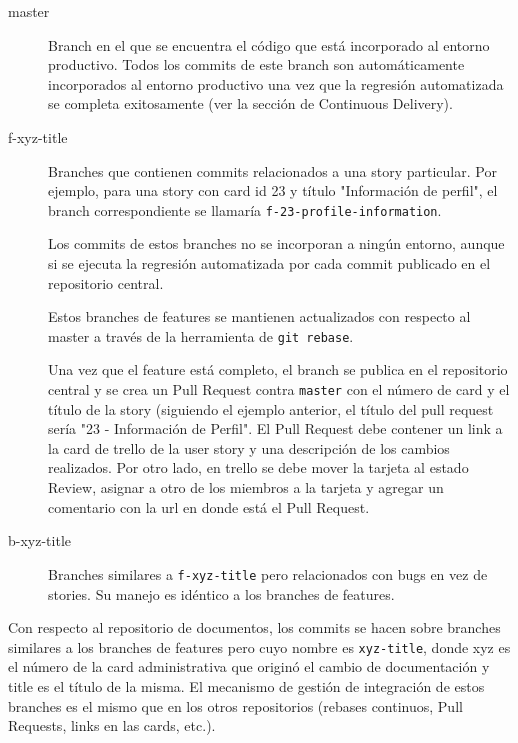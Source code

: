 \documentclass[a4paper,11pt]{article}
\begin{document}
\begin{description}

  \item[master]

    Branch en el que se encuentra el código que está incorporado al entorno
    productivo. Todos los commits de este branch son automáticamente
    incorporados al entorno productivo una vez que la regresión automatizada se
    completa exitosamente (ver la sección de Continuous Delivery).

  \item[f-xyz-title]

    Branches que contienen commits relacionados a una story particular. Por
    ejemplo, para una story con card id 23 y título "Información de perfil", el
    branch correspondiente se llamaría \texttt{f-23-profile-information}.

    Los commits de estos branches no se incorporan a ningún entorno, aunque si
    se ejecuta la regresión automatizada por cada commit publicado en el
    repositorio central.

    Estos branches de features se mantienen actualizados con respecto al master
    a través de la herramienta de \texttt{git rebase}.

    Una vez que el feature está completo, el branch se publica en el
    repositorio central y se crea un Pull Request contra \texttt{master} con el
    número de card y el título de la story (siguiendo el ejemplo anterior, el
    título del pull request sería "23 - Información de Perfil". El Pull Request
    debe contener un link a la card de trello de la user story y una
    descripción de los cambios realizados. Por otro lado, en trello se debe
    mover la tarjeta al estado Review, asignar a otro de los miembros a la
    tarjeta y agregar un comentario con la url en donde está el Pull Request.

  \item[b-xyz-title]

    Branches similares a \texttt{f-xyz-title} pero relacionados con bugs en vez
    de stories. Su manejo es idéntico a los branches de features.

\end{description}

Con respecto al repositorio de documentos, los commits se hacen sobre branches
similares a los branches de features pero cuyo nombre es \texttt{xyz-title},
donde xyz es el número de la card administrativa que originó el cambio de
documentación y title es el título de la misma. El mecanismo de gestión de
integración de estos branches es el mismo que en los otros repositorios
(rebases continuos, Pull Requests, links en las cards, etc.).
\end{document}
